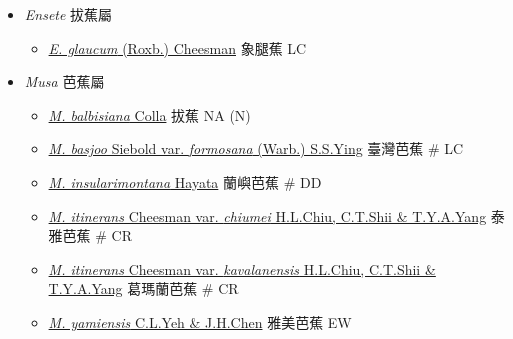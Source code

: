 
  \begin{itemize}
 \item[] \textit{Ensete} 拔蕉屬
                                
  \begin{itemize}
        \item[] \href{http://www.theplantlist.org/tpl1.1/search?q=Ensete+glaucum}{\textit{E. glaucum} (Roxb.) Cheesman}   象腿蕉   LC
  \end{itemize}
 \item[] \textit{Musa} 芭蕉屬
                                
  \begin{itemize}
        \item[] \href{http://www.theplantlist.org/tpl1.1/search?q=Musa+balbisiana}{\textit{M. balbisiana} Colla}   拔蕉   NA (N)
        \item[] \href{http://www.theplantlist.org/tpl1.1/search?q=Musa+basjoo+var.+formosana}{\textit{M. basjoo} Siebold var. \textit{formosana} (Warb.) S.S.Ying}   臺灣芭蕉  \# LC
        \item[] \href{http://www.theplantlist.org/tpl1.1/search?q=Musa+insularimontana}{\textit{M. insularimontana} Hayata}   蘭嶼芭蕉  \# DD
        \item[] \href{http://www.theplantlist.org/tpl1.1/search?q=Musa+itinerans+var.+chiumei}{\textit{M. itinerans} Cheesman var. \textit{chiumei} H.L.Chiu, C.T.Shii \& T.Y.A.Yang}   泰雅芭蕉  \# CR
        \item[] \href{http://www.theplantlist.org/tpl1.1/search?q=Musa+itinerans+var.+kavalanensis}{\textit{M. itinerans} Cheesman var. \textit{kavalanensis} H.L.Chiu, C.T.Shii \& T.Y.A.Yang}   葛瑪蘭芭蕉  \# CR
        \item[] \href{http://www.theplantlist.org/tpl1.1/search?q=Musa+yamiensis}{\textit{M. yamiensis} C.L.Yeh \& J.H.Chen}   雅美芭蕉   EW
  \end{itemize}
  \end{itemize}
